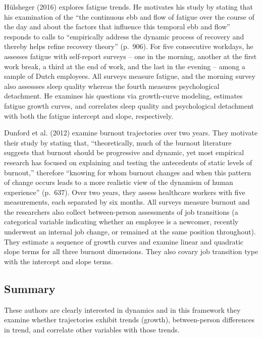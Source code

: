 \documentclass[english,,man]{apa6}
\theoremstyle{definition}
\theoremstyle{definition}
\theoremstyle{definition}
\theoremstyle{remark}
\begin{document}
Hülsheger (2016) explores fatigue trends. He motivates his study by
stating that his examination of the \enquote{the continuous ebb and flow
of fatigue over the course of the day and about the factors that
influence this temporal ebb and flow} responds to calls to
\enquote{empirically address the dynamic process of recovery and thereby
helps refine recovery theory} (p.~906). For five consecutive workdays,
he assesses fatigue with self-report surveys -- one in the morning,
another at the first work break, a third at the end of work, and the
last in the evening -- among a sample of Dutch employees. All surveys
measure fatigue, and the morning survey also assessses sleep quality
whereas the fourth measures psychological detachment. He examines his
questions via growth-curve modeling, estimates fatigue growth curves,
and correlates sleep quality and psychological detachment with both the
fatigue intercept and slope, respectively.

Dunford et al. (2012) examine burnout trajectories over two years. They
motivate their study by stating that, \enquote{theoretically, much of
the burnout literature suggests that burnout should be progressive and
dynamic, yet most empirical research has focused on explaining and
testing the antecedents of static levels of burnout,} therefore
\enquote{knowing for whom burnout changes and when this pattern of
change occurs leads to a more realistic view of the dynamism of human
experience} (p.~637). Over two years, they assess healthcare workers
with five measurements, each separated by six months. All surveys
measure burnout and the researchers also collect between-person
assessments of job transitions (a categorical variable indicating
whether an employee is a newcomer, recently underwent an internal job
change, or remained at the same position throughout). They estimate a
sequence of growth curves and examine linear and quadratic slope terms
for all three burnout dimensions. They also covary job transition type
with the intercept and slope terms.

\hypertarget{summary}{%
\subsection{Summary}\label{summary}}

These authors are clearly interested in dynamics and in this framework
they examine whether trajectories exhibit trends (growth),
between-person differences in trend, and correlate other variables with
those trends.
\end{document}
